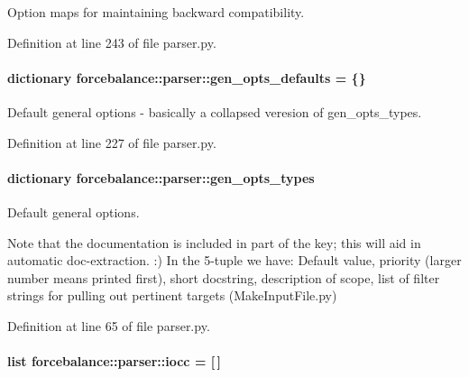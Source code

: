 \-Option maps for maintaining backward compatibility. 



\-Definition at line 243 of file parser.\-py.

\hypertarget{namespaceforcebalance_1_1parser_a807ea3a28fedbdfd494f5cc8da063202}{
\paragraph[{gen\-\_\-opts\-\_\-defaults}]{\setlength{\rightskip}{0pt plus 5cm}dictionary {\bf forcebalance\-::parser\-::gen\-\_\-opts\-\_\-defaults} = \{\}}}\label{namespaceforcebalance_1_1parser_a807ea3a28fedbdfd494f5cc8da063202}


\-Default general options -\/ basically a collapsed veresion of gen\-\_\-opts\-\_\-types. 



\-Definition at line 227 of file parser.\-py.

\hypertarget{namespaceforcebalance_1_1parser_a2ac3b892432d1c614c32eebeb8de41c5}{
\paragraph[{gen\-\_\-opts\-\_\-types}]{\setlength{\rightskip}{0pt plus 5cm}dictionary {\bf forcebalance\-::parser\-::gen\-\_\-opts\-\_\-types}}}\label{namespaceforcebalance_1_1parser_a2ac3b892432d1c614c32eebeb8de41c5}


\-Default general options. 

\-Note that the documentation is included in part of the key; this will aid in automatic doc-\/extraction. \-:) \-In the 5-\/tuple we have\-: \-Default value, priority (larger number means printed first), short docstring, description of scope, list of filter strings for pulling out pertinent targets (\-Make\-Input\-File.\-py) 

\-Definition at line 65 of file parser.\-py.

\hypertarget{namespaceforcebalance_1_1parser_af730ef69e27de8ffbf475f844c5c2d5f}{
\paragraph[{iocc}]{\setlength{\rightskip}{0pt plus 5cm}list {\bf forcebalance\-::parser\-::iocc} = \mbox{[}$\,$\mbox{]}}}\label{namespaceforcebalance_1_1parser_af730ef69e27de8ffbf475f844c5c2d5f}


